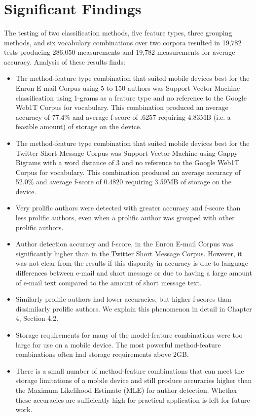 \section{Significant Findings}
\paragraph*{} The testing of two classification methods, five feature types, three grouping methods, and six vocabulary combinations over two corpora resulted in 19,782 tests producing 286,050 measurements and 19,782 measurements for average accuracy.  Analysis of these results finds:
\begin{itemize} 
	\item The method-feature type combination that suited mobile devices best for the Enron E-mail Corpus using 5 to 150 authors was Support Vector Machine classification using 1-grams as a feature type and no reference to the Google Web1T Corpus for vocabulary.  This combination produced an average accuracy of 77.4\% and average f-score of .6257 requiring 4.83MB (i.e. a feasible amount) of storage on the device.
	\item The method-feature type combination that suited mobile devices best for the Twitter Short Message Corpus was Support Vector Machine using Gappy Bigrams with a word distance of 3 and no reference to the Google Web1T Corpus for vocabulary. This combination produced an average accuracy of 52.0\% and average f-score of 0.4820 requiring 3.59MB of storage on the device.
	\item Very prolific authors were detected with greater accuracy and f-score than less prolific authors, even when a prolific author was grouped with other prolific authors.
	\item Author detection accuracy and f-score, in the Enron E-mail Corpus was significantly higher than in the Twitter Short Message Corpus. However, it was not clear from the results if this disparity in accuracy is due to language differences between e-mail and short message or due to having a large amount of e-mail text compared to the amount of short message text.
	\item Similarly prolific authors had lower accuracies, but higher f-scores than dissimilarly prolific authors. We explain this phenomenon in detail in Chapter 4, Section 4.2.
	\item Storage requirements for many of the model-feature combinations were too large for use on a mobile device.  The most powerful method-feature combinations often had storage requirements above 2GB.
	\item There is a small number of method-feature combinations that can meet the storage limitations of a mobile device and still produce accuracies higher than the Maximum Likelihood Estimate (MLE) for author detection.  Whether these accuracies are sufficiently high for practical application is left for future work.
\end{itemize}
	

